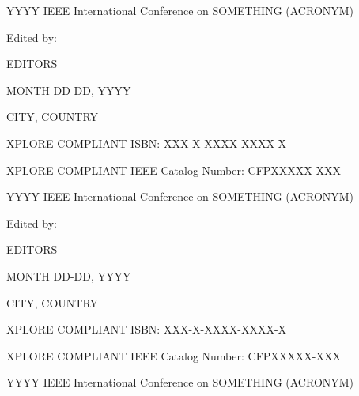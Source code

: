 \documentclass[letterpaper,oneside]{book}
\begin{document}
\frontmatter
%
\pagestyle{empty}
\null\vspace{5cm}
\begin{center}
\Huge YYYY IEEE International Conference on SOMETHING
(ACRONYM)

\vspace{2cm}
\Large
Edited by:

EDITORS

\vspace{2cm}
\large
MONTH DD-DD, YYYY

\vspace{2cm}

CITY, COUNTRY

\vspace{5cm}

XPLORE COMPLIANT ISBN: XXX-X-XXXX-XXXX-X

XPLORE COMPLIANT IEEE Catalog Number: CFPXXXXX-XXX

\end{center}
\newpage
\pagestyle{plain}
\null\vspace{5cm}
{}
\begin{center}
\Huge YYYY IEEE International Conference on SOMETHING
(ACRONYM)

\vspace{2cm}
\Large
Edited by:

EDITORS

\vspace{2cm}
\large
MONTH DD-DD, YYYY

\vspace{2cm}

CITY, COUNTRY

\vspace{5cm}

XPLORE COMPLIANT ISBN: XXX-X-XXXX-XXXX-X

XPLORE COMPLIANT IEEE Catalog Number: CFPXXXXX-XXX

\end{center}
\newpage
\begin{center}
{}
\null\vspace{7.0cm}
\end{center}

 YYYY IEEE International Conference on SOMETHING (ACRONYM)
\end{document}
